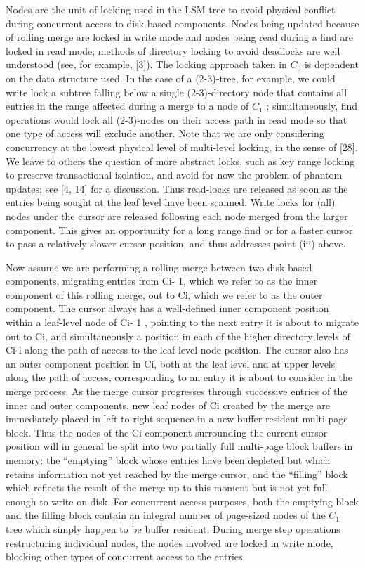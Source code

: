 \documentclass[a4paper,12pt,notitlepage,twoside,openright]{article}
\begin{document}
Nodes are the unit of locking used in the LSM-tree to avoid physical
conflict during concurrent access to disk based components. Nodes being
updated because of rolling merge are locked in write mode and nodes
being read during a find are locked in read mode; methods of directory
locking to avoid deadlocks are well understood (see, for example,
{[}3{]}). The locking approach taken in \(C_0\) is dependent on the data
structure used. In the case of a (2-3)-tree, for example, we could write
lock a subtree falling below a single (2-3)-directory node that contains
all entries in the range affected during a merge to a node of \(C_1\) ;
simultaneously, find operations would lock all (2-3)-nodes on their
access path in read mode so that one type of access will exclude
another. Note that we are only considering concurrency at the lowest
physical level of multi-level locking, in the sense of {[}28{]}. We
leave to others the question of more abstract locks, such as key range
locking to preserve transactional isolation, and avoid for now the
problem of phantom updates; see {[}4, 14{]} for a discussion. Thus
read-locks are released as soon as the entries being sought at the leaf
level have been scanned. Write locks for (all) nodes under the cursor
are released following each node merged from the larger component. This
gives an opportunity for a long range find or for a faster cursor to
pass a relatively slower cursor position, and thus addresses point (iii)
above.

Now assume we are performing a rolling merge between two disk based
components, migrating entries from Ci- 1, which we refer to as the inner
component of this rolling merge, out to Ci, which we refer to as the
outer component. The cursor always has a well-defined inner component
position within a leaf-level node of Ci- 1 , pointing to the next entry
it is about to migrate out to Ci, and simultaneously a position in each
of the higher directory levels of Ci-l along the path of access to the
leaf level node position. The cursor also has an outer component
position in Ci, both at the leaf level and at upper levels along the
path of access, corresponding to an entry it is about to consider in the
merge process. As the merge cursor progresses through successive entries
of the inner and outer components, new leaf nodes of Ci created by the
merge are immediately placed in left-to-right sequence in a new buffer
resident multi-page block. Thus the nodes of the Ci component
surrounding the current cursor position will in general be split into
two partially full multi-page block buffers in memory: the ``emptying''
block whose entries have been depleted but which retains information not
yet reached by the merge cursor, and the ``filling'' block which reflects
the result of the merge up to this moment but is not yet full enough to
write on disk. For concurrent access purposes, both the emptying block
and the filling block contain an integral number of page-sized nodes of
the \(C_1\) tree which simply happen to be buffer resident. During merge step
operations restructuring individual nodes, the nodes involved are locked
in write mode, blocking other types of concurrent access to the entries.
\end{document}
